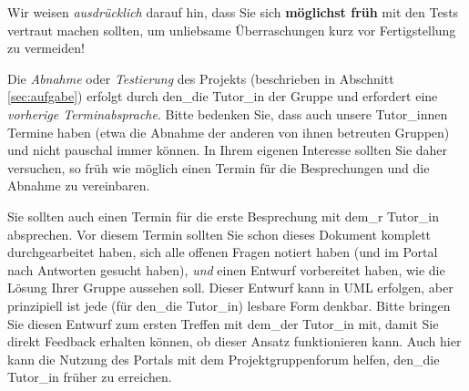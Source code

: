 Wir weisen \emph{ausdr\"ucklich} darauf hin, dass Sie sich \textbf{m\"oglichst fr\"uh} mit den Tests
vertraut machen sollten, um unliebsame \"Uberraschungen \glqq{}kurz vor Fertigstellung\grqq{} zu vermeiden!

Die \emph{Abnahme} oder \emph{Testierung} des Projekts (beschrieben in
Abschnitt \ref{sec:aufgabe}) erfolgt durch den\_die Tutor\_in der Gruppe und erfordert eine
\emph{vorherige Terminabsprache}. Bitte bedenken Sie, dass auch unsere Tutor\_innen
Termine haben (etwa die Abnahme der anderen von ihnen betreuten Gruppen) und
nicht \glqq{}pauschal immer k\"onnen\grqq{}. In Ihrem eigenen Interesse sollten Sie
daher versuchen, so fr\"uh wie m\"oglich einen Termin f\"ur die Besprechungen und 
die Abnahme zu vereinbaren.

Sie sollten auch einen Termin f\"ur die erste Besprechung mit dem\_r Tutor\_in absprechen.
Vor diesem Termin sollten Sie schon dieses Dokument komplett durchgearbeitet haben,
sich alle offenen Fragen notiert haben (und im Portal nach Antworten gesucht haben),
\emph{und} einen Entwurf vorbereitet haben, wie die L\"osung Ihrer Gruppe aussehen soll.
Dieser Entwurf kann in UML erfolgen, aber prinzipiell ist jede (f\"ur den\_die Tutor\_in) lesbare Form
denkbar. Bitte bringen Sie diesen Entwurf zum ersten Treffen mit dem\_der Tutor\_in mit, damit
Sie direkt Feedback erhalten k\"onnen, ob dieser Ansatz funktionieren kann.
Auch hier kann die Nutzung des Portals mit dem Projektgruppenforum helfen, den\_die
Tutor\_in \glqq{}fr\"uher zu erreichen\grqq{}.
